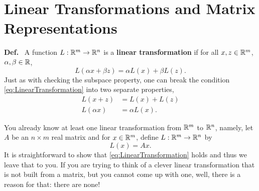 \section{Linear Transformations and Matrix Representations}

\noindent \textbf{Def.}~ A function $L:\mathbb R^m \to \mathbb R^n $ is a \textbf{linear transformation} if for all $x, z \in \mathbb R^m$, $\alpha, \beta \in \mathbb R$, 
\begin{equation}
\label{eq:LinearTransformation}
    L(\alpha x + \beta z) = \alpha L(x) + \beta L(z).
\end{equation}
Just as with checking the subspace property, one can break the condition \eqref{eq:LinearTransformation} into two separate properties, 
    \begin{align*}
    L(x + z) &= L(x) + L(z)\\
        L(\alpha x) &= \alpha L(x). 
    \end{align*}
    
    
You already know at least one linear transformation from $\mathbb R^m$ to $\mathbb R^n$, namely, let $A$ be an $n \times m$ real matrix and for $x\in \mathbb R^m$, define $L:\mathbb R^m \to \mathbb R^n $ by
\begin{equation}
\label{eq:LinearTransformation02}
    L(x) = Ax.
\end{equation}
It is straightforward to show that \eqref{eq:LinearTransformation} holds and thus we leave that to you. If you are trying to think of a clever linear transformation that is not built from a matrix, but you cannot come up with one, well, there is a reason for that: there are none!  

\vspace*{0.2cm}

